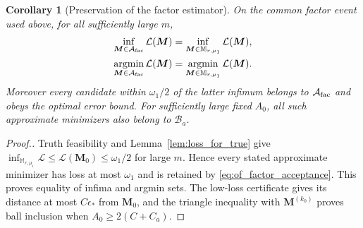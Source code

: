 \documentclass[numsec,webpdf,modern,large,namedate]{oup-authoring-template}
\theoremstyle{plain}
\newtheorem{scorollary}{Corollary}%
\theoremstyle{remark}
\newcommand{\M}{\bm{M}}
\newif\ifmarkchanges
\newenvironment{revision}{\begingroup\ifmarkchanges\color{red}\fi}{\endgroup}
\begin{document}
\begin{revision}
\begin{scorollary}[Preservation of the factor estimator]
\label{cor:of_estimator_fidelity}
On the common factor event used above, for
all sufficiently large $m$,
\begin{align}
 \inf_{\M\in\mathcal A_{\rm fac}}\mathcal L(\M)
 &=\inf_{\M\in\mathbb M_{r,\mu_1}}\mathcal L(\M),\label{eq:of_same_infimum}\\
 \operatorname*{argmin}_{\M\in\mathcal A_{\rm fac}}\mathcal L(\M)
 &=\operatorname*{argmin}_{\M\in\mathbb M_{r,\mu_1}}\mathcal L(\M).
 \label{eq:of_same_argmin}
\end{align}
Moreover every candidate within $\omega_1/2$ of the latter infimum belongs
to $\mathcal A_{\rm fac}$ and obeys the optimal error bound.  For sufficiently
large fixed $A_0$, all such approximate minimizers also belong to
$\mathcal B_a$.
\end{scorollary}
\begin{proof}[Proof.]
Truth feasibility and Lemma~\ref{lem:loss_for_true} give
$\inf_{\mathbb M_{r,\mu_1}}\mathcal L\le\mathcal L(\M_0)
\le\omega_1/2$ for large $m$.  Hence every stated approximate minimizer
has loss at most $\omega_1$ and is retained by
\eqref{eq:of_factor_acceptance}.  This proves equality of infima and
argmin sets.  The low-loss certificate gives its distance at most
$C\epsilon_*$ from $\M_0$, and the triangle inequality with $\M^{(k_0)}$
proves ball inclusion when $A_0\ge2(C+C_a)$.  
\end{proof}


\end{revision}
\end{document}
